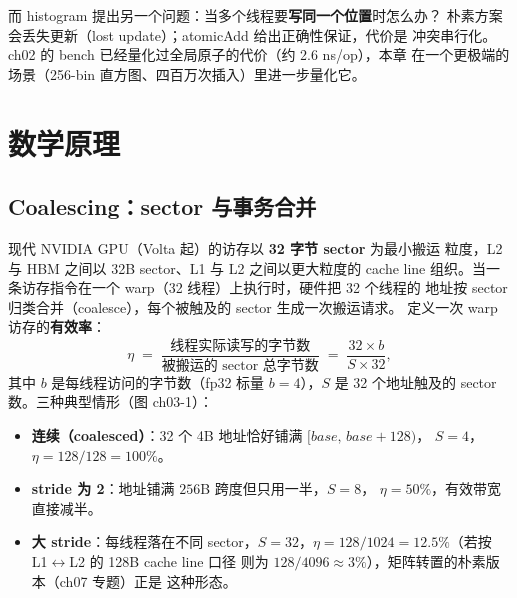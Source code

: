 而 histogram 提出另一个问题：当多个线程要\textbf{写同一个位置}时怎么办？
朴素方案会丢失更新（lost update）；atomicAdd 给出正确性保证，代价是
冲突串行化。ch02 的 bench 已经量化过全局原子的代价（约 2.6 ns/op），本章
在一个更极端的场景（256-bin 直方图、四百万次插入）里进一步量化它。

\section{数学原理}\label{sec:ch03-math}

\subsection{Coalescing：sector 与事务合并}

现代 NVIDIA GPU（Volta 起）的访存以 \textbf{32 字节 sector} 为最小搬运
粒度，L2 与 HBM 之间以 32B sector、L1 与 L2 之间以更大粒度的 cache line
组织。当一条访存指令在一个 warp（32 线程）上执行时，硬件把 32 个线程的
地址按 sector 归类合并（coalesce），每个被触及的 sector 生成一次搬运请求。
定义一次 warp 访存的\textbf{有效率}：
\begin{equation}
  \eta \;=\; \frac{\text{线程实际读写的字节数}}
                  {\text{被搬运的 sector 总字节数}}
  \;=\; \frac{32 \times b}{S \times 32},
  \label{eq:ch03-eta}
\end{equation}
其中 $b$ 是每线程访问的字节数（fp32 标量 $b = 4$），$S$ 是 32 个地址触及的
sector 数。三种典型情形（图 ch03-1）：

\begin{itemize}
\item \textbf{连续（coalesced）}：32 个 4B 地址恰好铺满 $[base,\, base+128)$，
  $S = 4$，$\eta = 128/128 = 100\%$。
\item \textbf{stride 为 2}：地址铺满 $256$B 跨度但只用一半，$S = 8$，
  $\eta = 50\%$，有效带宽直接减半。
\item \textbf{大 stride}：每线程落在不同 sector，$S = 32$，$\eta =
  128/1024 = 12.5\%$（若按 L1$\leftrightarrow$L2 的 128B cache line 口径
  则为 $128/4096 \approx 3\%$），矩阵转置的朴素版本（ch07 专题）正是
  这种形态。
\end{itemize}

